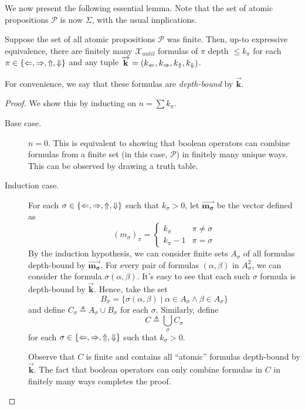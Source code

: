 \documentclass[a4paper,UKenglish,cleveref, autoref, thm-restate, numberwithinsect]{lipics-v2021}
\def\Larrow{\ensuremath\mathord{\Leftarrow}}
\def\Rarrow{\ensuremath\mathord{\Rightarrow}}
\def\Uarrow{\ensuremath\mathord{\Uparrow}}
\def\Darrow{\ensuremath\mathord{\Downarrow}}
\newcommand{\myvec}[1]{\overrightarrow{\mathbf{#1}}}
\begin{document}
We now present the following essential lemma. Note that the set of atomic propositions $\mathcal{P}$ is now $\Sigma$, with the usual implications.
\begin{lemma}
    \label{lemma:count-limiter-efgames}
    Suppose the set of all atomic propositions $\mathcal{P}$ was finite. Then, up-to expressive equivalence, there are finitely many $\mathcal{X}_{until}$ formulas of $\pi$ depth $\leq k_\pi$ for each $\pi \in \{\Larrow, \Rarrow, \Uarrow, \Darrow\}$ and any tuple $\myvec{k} = (k_{\Larrow}, k_{\Rarrow}, k_{\Uarrow}, k_{\Darrow})$.
    \begin{remark*}
        For convenience, we say that these formulas are \emph{depth-bound} by $\myvec{k}$.
    \end{remark*}
\end{lemma}
\begin{proof}
    We show this by inducting on $n = \sum k_\pi$.
    \begin{description}
        \item[Base case.] $n = 0$. This is equivalent to showing that boolean operators can combine formulas from a finite set (in this case, $\mathcal{P}$) in finitely many unique ways. This can be observed by drawing a truth table.
        \item[Induction case.]
            For each $\sigma \in \{\Larrow, \Rarrow, \Uarrow, \Darrow\}$ such that $k_\sigma > 0$, let $\myvec{m_\sigma}$ be the vector defined as
            \begin{equation}
                \label{eq:m-sigma-defn}
                {(m_\sigma)}_\pi = \begin{cases}
                    k_\pi & \pi \neq \sigma \\
                    k_\pi - 1 & \pi = \sigma
                \end{cases}
            \end{equation}
            By the induction hypothesis, we can consider finite sets $A_\sigma$ of all formulas depth-bound by $\myvec{m_\sigma}$. For every pair of formulas $(\alpha, \beta)$ in $A_\sigma^2$, we can consider the formula $\sigma(\alpha, \beta)$. It's easy to see that each such $\sigma$ formula is depth-bound by $\myvec{k}$. Hence, take the set
            \begin{equation*}
                B_\sigma = \{\sigma(\alpha, \beta) \mid \alpha \in A_\sigma \land \beta \in A_\sigma \}
            \end{equation*}
            and define $C_\sigma \triangleq A_\sigma \cup B_\sigma$ for each $\sigma$. Similarly, define
            \begin{equation*}
                C \triangleq \bigcup_\sigma C_\sigma
            \end{equation*}
            for each $\sigma \in \{\Larrow, \Rarrow, \Uarrow, \Darrow\}$ such that $k_\sigma > 0$.

            Observe that $C$ is finite and contains all ``atomic'' formulas depth-bound by $\myvec{k}$. The fact that boolean operators can only combine formulas in $C$ in finitely many ways completes the proof.
    \end{description}
\end{proof}
\end{document}
